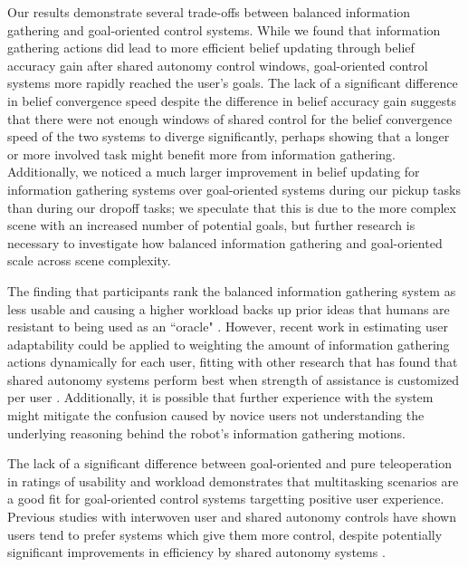 \documentclass[conference]{IEEEtran}
\begin{document}
Our results demonstrate several trade-offs between balanced information gathering and goal-oriented control systems. While we found that information gathering actions did lead to more efficient belief updating through belief accuracy gain after shared autonomy control windows, goal-oriented control systems more rapidly reached the user's goals. The lack of a significant difference in belief convergence speed despite the difference in belief accuracy gain suggests that there were not enough windows of shared control for the belief convergence speed of the two systems to diverge significantly, perhaps showing that a longer or more involved task might benefit more from information gathering. Additionally, we noticed a much larger improvement in belief updating for information gathering systems over goal-oriented systems during our pickup tasks than during our dropoff tasks; we speculate that this is due to the more complex scene with an increased number of potential goals, but further research is necessary to investigate how balanced information gathering and goal-oriented scale across scene complexity.

The finding that participants rank the balanced information gathering system as less usable and causing a higher workload backs up prior ideas that humans are resistant to being used as an ``oracle" \cite{javdani2015shared}. However, recent work in estimating user adaptability \cite{nikolaidis2017human} could be applied to weighting the amount of information gathering actions dynamically for each user, fitting with other research that has found that shared autonomy systems perform best when strength of assistance is customized per user \cite{gopinath2017human}. Additionally, it is possible that further experience with the system might mitigate the confusion caused by novice users not understanding the underlying reasoning behind the robot's information gathering motions. 

The lack of a significant difference between goal-oriented and pure teleoperation in ratings of usability and workload demonstrates that multitasking scenarios are a good fit for goal-oriented control systems targetting positive user experience. Previous studies with interwoven user and shared autonomy controls have shown users tend to prefer systems which give them more control, despite potentially significant improvements in efficiency by shared autonomy systems \cite{javdani2015shared, javdani2018shared}.
\end{document}
